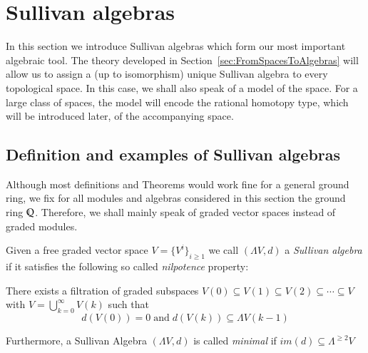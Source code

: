 \section{Sullivan algebras}

In this section we introduce Sullivan algebras which form our most important algebraic tool. The theory
developed in  Section~\ref{sec:FromSpacesToAlgebras} will allow us to assign a (up to isomorphism) unique Sullivan algebra
to every topological space. In this case, we shall also speak of a model of the space. For a large class of spaces,
the model will encode the rational 
homotopy type, which will be introduced later, of the accompanying space.
% 


\subsection{Definition and examples of Sullivan algebras}
Although most definitions and Theorems would work fine for a general ground ring, we fix for 
all modules and algebras considered in this section the ground ring $\mathbb{Q}$. Therefore, we shall mainly speak of 
graded vector spaces instead of graded modules.

\begin{Definition}
 Given a free graded vector space $V = {\lbrace {V^i}\rbrace}_{ i \geq 1} $ we call $(\Lambda V, d)$ a \emph{Sullivan algebra} 
 if it satisfies the following so called \emph{nilpotence} property:
 
  There exists a filtration of graded subspaces $V(0) \subseteq V(1) \subseteq V(2) \subseteq \cdots \subseteq V$
  with $ V = \bigcup_{k = 0}^{\infty} V(k)$ such that 
  $$ d(V(0)) = 0 \; \text{and} \; d( V(k)) \subseteq  \Lambda V(k-1) $$
  
 Furthermore, a Sullivan Algebra $(\Lambda V,d)$ is called \emph{minimal} if $im(d) \subseteq \Lambda^{\geq 2} V$
\end{Definition}

